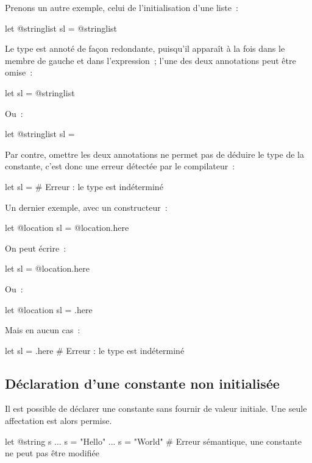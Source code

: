 Prenons un autre exemple, celui de l'initialisation d'une liste~:
\begin{galgas4}
let @stringlist sl = @stringlist {}
\end{galgas4}

Le type est annoté de façon redondante, puisqu'il apparaît à la fois dans le membre de gauche et dans l'expression~; l'une des deux annotations peut être omise~:
\begin{galgas4}
let sl = @stringlist {}
\end{galgas4}

Ou~:
\begin{galgas4}
let @stringlist sl = {}
\end{galgas4}

Par contre, omettre les deux annotations ne permet pas de déduire le type de la constante, c'est donc une erreur détectée par le compilateur~:
\begin{galgas4}
let sl = {} # Erreur : le type est indéterminé
\end{galgas4}

Un dernier exemple, avec un constructeur~:
\begin{galgas4}
let @location sl = @location.here
\end{galgas4}

On peut écrire~:
\begin{galgas4}
let sl = @location.here
\end{galgas4}

Ou~:
\begin{galgas4}
let @location sl = .here
\end{galgas4}

Mais en aucun cas~:
\begin{galgas4}
let sl = .here # Erreur : le type est indéterminé
\end{galgas4}


\subsection{Déclaration d'une constante non initialisée}

Il est possible de déclarer une constante sans fournir de valeur initiale. Une seule affectation est alors permise.

\begin{galgas4}
let @string s
...
s = "Hello"
...
s = "World" # Erreur sémantique, une constante ne peut pas être modifiée
\end{galgas4}

